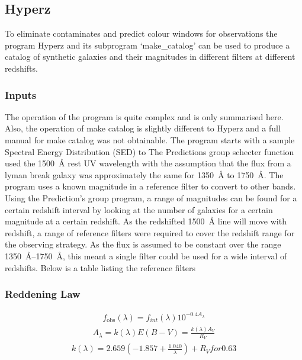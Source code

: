     \subsection{Hyperz} %
	\label{sub:Hyperz}
		To eliminate contaminates and predict colour windows for observations the program Hyperz and its subprogram `make\_catalog' can be used to produce a catalog of synthetic galaxies and their magnitudes in different filters at different redshifts.

        \subsubsection{Inputs} %
        \label{subsub:Hyperz_inputs}
			The operation of the program is quite complex and is only summarised here. Also, the operation of make catalog is slightly different to Hyperz and a full manual for make catalog was not obtainable. The program starts with a sample Spectral Energy Distribution (SED) to  The Predictions group schecter function used the \SI{1500}{\angstrom} rest UV wavelength with the assumption that the flux from a lyman break galaxy was approximately the same for \SI{1350}{\angstrom} to \SI{1750}{\angstrom}. The program uses a known magnitude in a reference filter to convert to other bands. Using the Prediction's group program, a range of magnitudes can be found for a certain redshift interval by looking at the number of galaxies for a certain magnitude at a certain redshift. As the redshifted \SI{1500}{\angstrom} line will move with redshift, a range of reference filters were required to cover the redshift range for the observing strategy. As the flux is assumed to be constant over the range \SI{1350}{\angstrom}--\SI{1750}{\angstrom}, this meant a single filter could be used for a wide interval of redshifts. Below is a table listing the reference filters

		\subsubsection{Reddening Law} %
		\label{ssub:reddening_law}
			\begin{align}
				f_\text{obs}(\lambda)=f_{int}(\lambda)10^{-0.4A_\lambda}
			\end{align}
			\begin{align}
				A_\lambda=k(\lambda)E(B-V)=\frac{k(\lambda)A_V}{R_V}
			\end{align}
			\begin{align}
				k(\lambda)=2.659(-1.857+\frac{1.040}{\lambda})+R_V for 0.63%
			\end{align}


